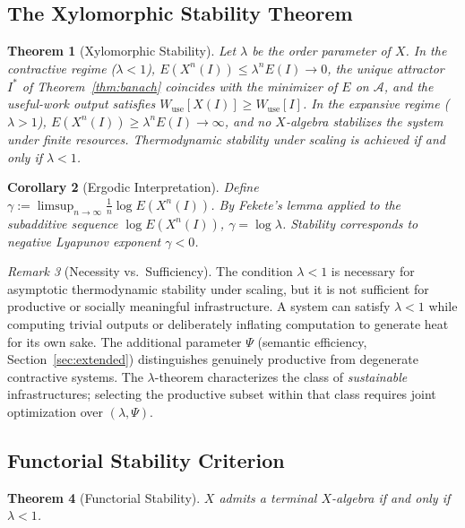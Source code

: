 \documentclass[10pt,twocolumn]{article}
\theoremstyle{plain}
\newtheorem{theorem}{Theorem}
\newtheorem{corollary}[theorem]{Corollary}
\theoremstyle{definition}
\theoremstyle{remark}
\newtheorem{remark}[theorem]{Remark}
\begin{document}
\subsection{The Xylomorphic Stability Theorem}

\begin{theorem}[Xylomorphic Stability]
\label{thm:stability}
Let $\lambda$ be the order parameter of $X$. In the contractive regime
($\lambda < 1$), $E(X^n(I)) \leq \lambda^n E(I) \to 0$, the unique
attractor $I^*$ of Theorem~\ref{thm:banach} coincides with the
minimizer of $E$ on $\mathcal{A}$, and the useful-work output satisfies
$W_{\mathrm{use}}[X(I)] \geq W_{\mathrm{use}}[I]$. In the expansive
regime ($\lambda > 1$), $E(X^n(I)) \geq \lambda^n E(I) \to \infty$,
and no $X$-algebra stabilizes the system under finite resources.
Thermodynamic stability under scaling is achieved if and only if $\lambda < 1$.
\end{theorem}

\begin{corollary}[Ergodic Interpretation]
Define $\gamma := \limsup_{n \to \infty} \frac{1}{n} \log E(X^n(I))$.
By Fekete's lemma applied to the subadditive sequence $\log E(X^n(I))$,
$\gamma = \log \lambda$. Stability corresponds to negative Lyapunov
exponent $\gamma < 0$.
\end{corollary}

\begin{remark}[Necessity vs.\ Sufficiency]
\label{rem:necessity}
The condition $\lambda < 1$ is necessary for asymptotic thermodynamic
stability under scaling, but it is not sufficient for productive or
socially meaningful infrastructure. A system can satisfy $\lambda < 1$
while computing trivial outputs or deliberately inflating computation
to generate heat for its own sake. The additional parameter $\Psi$
(semantic efficiency, Section~\ref{sec:extended}) distinguishes
genuinely productive from degenerate contractive systems. The
$\lambda$-theorem characterizes the class of \emph{sustainable}
infrastructures; selecting the productive subset within that class
requires joint optimization over $(\lambda, \Psi)$.
\end{remark}

\subsection{Functorial Stability Criterion}

\begin{theorem}[Functorial Stability]
$X$ admits a terminal $X$-algebra if and only if $\lambda < 1$.
\end{theorem}
\end{document}

